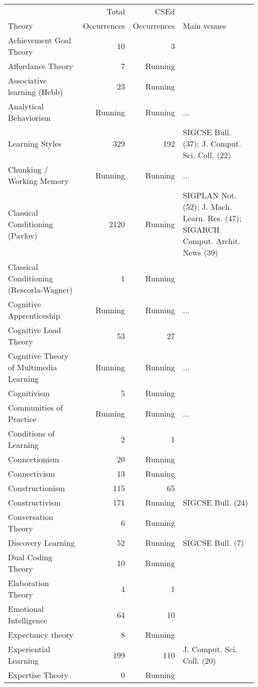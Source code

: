 \begin{table*}[t]
\begin{tabular}{lrrp{6cm}}
& Total & CSEd & \\Theory & Occurrences & Occurrences & Main venues\\\hline
Achievement Goal Theory & 10 & 3 &  \\
Affordance Theory & 7 & Running &  \\
Associative learning (Hebb) & 23 & Running &  \\
Analytical Behaviorism & Running & Running & ... \\
Learning Styles & 329 & 192 & SIGCSE Bull. (37); J. Comput. Sci. Coll. (22) \\
Chunking / Working Memory & Running & Running & ... \\
Classical Conditioning (Pavlov) & 2120 & Running & SIGPLAN Not. (52); J. Mach. Learn. Res. (47); SIGARCH Comput. Archit. News (39) \\
Classical Conditioning (Rescorla-Wagner) & 1 & Running &  \\
Cognitive Apprenticeship & Running & Running & ... \\
Cognitive Load Theory & 53 & 27 &  \\
Cognitive Theory of Multimedia Learning & Running & Running & ... \\
Cognitivism & 5 & Running &  \\
Communities of Practice & Running & Running & ... \\
Conditions of Learning & 2 & 1 &  \\
Connectionism & 20 & Running &  \\
Connectivism & 13 & Running &  \\
Constructionism & 115 & 65 &  \\
Constructivism & 171 & Running & SIGCSE Bull. (24) \\
Conversation Theory & 6 & Running &  \\
Discovery Learning & 52 & Running & SIGCSE Bull. (7) \\
Dual Coding Theory & 10 & Running &  \\
Elaboration Theory & 4 & 1 &  \\
Emotional Intelligence & 64 & 10 &  \\
Expectancy theory & 8 & Running &  \\
Experiential Learning & 199 & 110 & J. Comput. Sci. Coll. (20) \\
Expertise Theory & 0 & Running &  \\

\end{tabular}
\end{table*}
